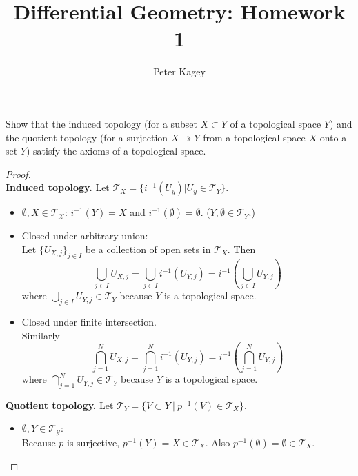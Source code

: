 \documentclass{article}
\newenvironment{problem}[2][Problem]{\begin{trivlist}
\item[\hskip \labelsep {\bfseries #1}\hskip \labelsep {\bfseries #2.}]}{\end{trivlist}}
\begin{document}
\title{Differential Geometry: Homework 1}
\author{Peter Kagey}

\maketitle

\begin{problem}{1}
  Show that the induced topology
  (for a subset $X \subset Y$ of a topological space $Y$)
  and the quotient topology (for a surjection $X \twoheadrightarrow Y$ from a
  topological space $X$ onto a set $Y$)
  satisfy the axioms of a topological space.
\end{problem}

\begin{proof} \text{} \\
  \textbf{Induced topology.}
  Let $\mathcal{T}_X = \{i^{-1}(U_y) | U_y \in \mathcal{T}_Y\}$.
  \begin{itemize}
    \item $\emptyset, X \in \mathcal{T_X}$:
    $i^{-1}(Y) = X$ and $i^{-1}(\emptyset) = \emptyset$.
    ($Y, \emptyset \in \mathcal{T}_Y$.)
    \item Closed under arbitrary union:\\
    Let $\{U_{X,j}\}_{j \in I}$ be a collection of open sets in $\mathcal{T}_X$.
    Then \[
      \bigcup\limits_{j\in I} U_{X, j}
      = \bigcup\limits_{j\in I} i^{-1}(U_{Y,j})
      = i^{-1}(\bigcup_{j\in I} U_{Y, j})
    \] where $\bigcup_{j\in I} U_{Y, j} \in \mathcal{T}_Y$
    because $Y$ is a topological space.
    \item Closed under finite intersection.\\
    Similarly \[
      \bigcap_{j = 1}^N U_{X, j}
      = \bigcap_{j = 1}^N i^{-1}(U_{Y,j})
      = i^{-1}(\bigcap_{j = 1}^N U_{Y, j})
    \] where $\bigcap_{j = 1}^N U_{Y, j} \in \mathcal{T}_Y$
    because $Y$ is a topological space.
  \end{itemize}

  \textbf{Quotient topology.}
  Let $\mathcal{T}_Y = \{V \subset Y\ |\ p^{-1}(V) \in \mathcal{T}_X\}$. \\
  \begin{itemize}
    \item $\emptyset, Y \in \mathcal{T_Y}$:\\
    Because $p$ is surjective, $p^{-1}(Y) = X \in \mathcal{T}_X$. Also
    $p^{-1}(\emptyset) = \emptyset \in \mathcal{T}_X$.


\end{itemize}
\end{proof}
\end{document}
